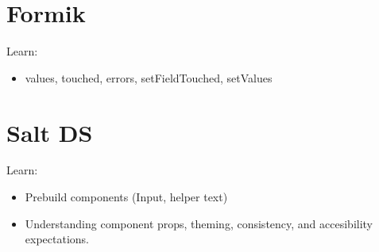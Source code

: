 \documentclass[11pt]{article}
\begin{document}
\section{Formik}
\label{sec:org46b574d}
Learn:
\begin{itemize}
\item values, touched, errors, setFieldTouched, setValues
\end{itemize}
\section{Salt DS}
\label{sec:org66fed9e}
Learn:
\begin{itemize}
\item Prebuild components (Input, helper text)
\item Understanding component props, theming, consistency, and accesibility expectations.
\end{itemize}
\end{document}
